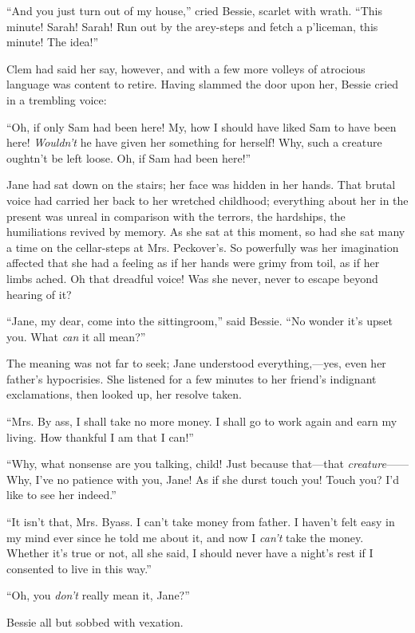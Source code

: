 ``And you just turn out of my house,'' cried Bessie, scarlet with wrath.
``This minute! Sarah! Sarah! Run out by the arey-steps and fetch a
p'liceman, this minute! The idea!''

Clem had said her say, however, and with a few more volleys of atrocious
language was content to retire. Having slammed the door upon her, Bessie
cried in a trembling voice:

``Oh, if only Sam had been here! My, how I should have liked Sam to have
been here! \emph{Wouldn't} he have given her something for herself! Why,
such a creature oughtn't be left loose. Oh, if Sam had been here!''

Jane had sat down on the stairs; her face was hidden in her hands. That
brutal voice had carried her back to her wretched childhood; everything
about her in the present was unreal in comparison with the terrors, the
hardships, the humiliations revived by memory. As she sat at this
moment, so had she sat many a time on the cellar-steps at Mrs.
Peckover's. So powerfully was her imagination affected that she had a
feeling as {\protect\hypertarget{248}{}{}}if her hands were grimy from
toil, as if her limbs ached. Oh that dreadful voice! Was she never,
never to escape beyond hearing of it?

``Jane, my dear, come into the sittingroom,'' said Bessie. ``No wonder
it's upset you. What \emph{can} it all mean?''

The meaning was not far to seek; Jane understood everything,---yes, even
her father's hypocrisies. She listened for a few minutes to her friend's
indignant exclamations, then looked up, her resolve taken.

``Mrs. By ass, I shall take no more money. I shall go to work again and
earn my living. How thankful I am that I can!''

``Why, what nonsense are you talking, child! Just because that---that
\emph{creature}{{------}}Why, I've no patience with you, Jane! As if she
durst touch you! Touch you? I'd like to see her indeed.''

``It isn't that, Mrs. Byass. I can't take money from father. I haven't
felt easy in my mind ever since he told me about it, and now I
\emph{can't} take the money. Whether it's true or not, all she said, I
should never have a night's rest if I consented to live in this way.''

{\protect\hypertarget{249}{}{}}``Oh, you \emph{don't} really mean it,
Jane?''

Bessie all but sobbed with vexation.

